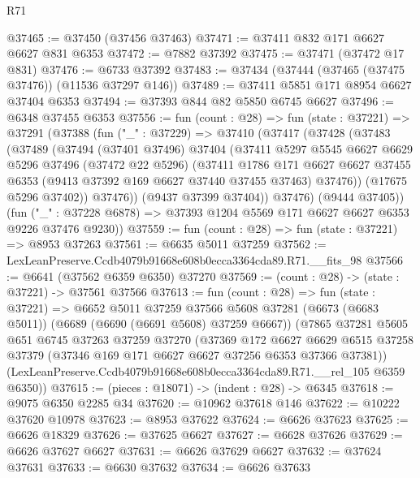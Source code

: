 \begin{lexlean}{R71}
\begin{coremodule}
@37465 := @37450 (@37456 @37463)
@37471 := @37411 @832 @171 @6627 @6627 @831 @6353
@37472 := @7882 @37392
@37475 := @37471 (@37472 @17 @831)
@37476 := @6733 @37392
@37483 := @37434 (@37444 (@37465 (@37475 @37476)) (@11536 @37297 @146))
@37489 := @37411 @5851 @171 @8954 @6627 @37404 @6353
@37494 := @37393 @844 @82 @5850 @6745 @6627
@37496 := @6348 @37455 @6353
@37556 := fun (count : @28) =>
  fun (state : @37221) =>
  @37291
    (@37388
      (fun ("_" : @37229) =>
      @37410
        (@37417
          (@37428
            (@37483
              (@37489
                (@37494
                  (@37401 @37496)
                  @37404
                  (@37411
                    @5297
                    @5545
                    @6627
                    @6629
                    @5296
                    @37496
                    (@37472 @22 @5296)
                    (@37411
                      @1786
                      @171
                      @6627
                      @6627
                      @37455
                      @6353
                      (@9413 @37392 @169 @6627 @37440 @37455 @37463)
                      @37476))
                  (@17675 @5296 @37402))
                @37476))
            (@9437 @37399 @37404))
          @37476)
        (@9444 @37405))
      (fun ("_" : @37228 @6878) => @37393 @1204 @5569 @171 @6627 @6627 @6353 @9226 @37476 @9230))
@37559 := fun (count : @28) => fun (state : @37221) => @8953 @37263
@37561 := @6635 @5011 @37259
@37562 := LexLeanPreserve.Ccdb4079b91668e608b0ecca3364cda89.R71.__fits_98
@37566 := @6641 (@37562 @6359 @6350) @37270
@37569 := (count : @28) -> (state : @37221) -> @37561 @37566
@37613 := fun (count : @28) =>
  fun (state : @37221) =>
  @6652
    @5011
    @37259
    @37566
    @5608
    @37281
    (@6673 (@6683 @5011))
    (@6689 (@6690 (@6691 @5608) @37259 @6667))
    (@7865
      @37281
      @5605
      @651
      @6745
      @37263
      @37259
      @37270
      (@37369
        @172
        @6627
        @6629
        @6515
        @37258
        @37379
        (@37346 @169 @171 @6627 @6627 @37256 @6353 @37366 @37381))
      (LexLeanPreserve.Ccdb4079b91668e608b0ecca3364cda89.R71.__rel_105 @6359 @6350))
@37615 := (pieces : @18071) -> (indent : @28) -> @6345
@37618 := @9075 @6350 @2285 @34
@37620 := @10962 @37618 @146
@37622 := @10222 @37620 @10978
@37623 := @8953 @37622
@37624 := @6626 @37623
@37625 := @6626 @18329
@37626 := @37625 @6627
@37627 := @6628 @37626
@37629 := @6626 @37627 @6627
@37631 := @6626 @37629 @6627
@37632 := @37624 @37631
@37633 := @6630 @37632
@37634 := @6626 @37633

\end{coremodule}
\end{lexlean}
